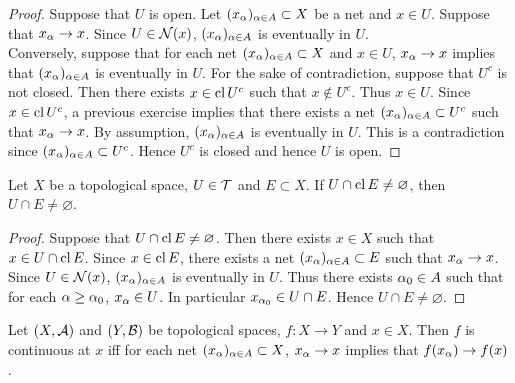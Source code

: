 \documentclass{book}
\begin{document}
	\begin{proof}
		Suppose that $U$ is open. Let $(x_{\alpha})_{\alpha \in A} \subset X$ be a net and $x \in U$. Suppose that $x_{\alpha} \rightarrow x$. Since $U \in \mathcal{N}(x)$, $(x_{\alpha})_{\alpha \in A}$ is eventually in $U$. \\
		Conversely, suppose that for each net $(x_{\alpha})_{\alpha \in A} \subset X$ and $x \in U$, $x_{\alpha} \rightarrow x$ implies that $(x_{\alpha})_{\alpha \in A} $ is eventually in $U$. For the sake of contradiction, suppose that $U^c$ is not closed. Then there exists $x \in \operatorname{cl} U^c$ such that $x \not \in U^c$. Thus $x \in U$. Since $x \in \operatorname{cl} U^c$, a previous exercise implies that there exists a net $(x_{\alpha})_{\alpha \in A} \subset U^c$ such that $x_{\alpha} \rightarrow x$. By assumption, $(x_{\alpha})_{\alpha \in A}$ is eventually in $U$. This is a contradiction since $(x_{\alpha})_{\alpha \in A} \subset U^c$. Hence $U^c$ is closed and hence $U$ is open. 
	\end{proof}

	\begin{ex} 
		Let $X$ be a topological space, $U \in \mathcal{T}$ and $E \subset X$. If $U \cap \operatorname{cl} E \neq \varnothing$, then $U \cap E \neq \varnothing$. 
	\end{ex}

	\begin{proof}
		Suppose that $U \cap \operatorname{cl} E \neq \varnothing$. Then there exists $x \in X$ such that $x \in U \cap \operatorname{cl} E$. Since $x \in \operatorname{cl} E$, there exists a net $(x_{\alpha})_{\alpha \in A} \subset E$ such that $x_{\alpha} \rightarrow x$. Since $U \in \mathcal{N}(x)$, $(x_{\alpha})_{\alpha \in A}$ is eventually in $U$. Thus there exists $\alpha_0 \in A$ such that for each $\alpha \geq \alpha_0$, $x_{\alpha} \in U$. In particular $x_{\alpha_0} \in U \cap E$. Hence $U \cap E \neq \varnothing$. 
	\end{proof}
	
	\begin{ex} 
	Let $(X,\mathcal{A})$ and $(Y,\mathcal{B})$ be topological spaces, $f:X \rightarrow Y$ and $x \in X$. Then $f$ is continuous at $x$ iff for each net $(x_{\alpha})_{\alpha \in A} \subset X$, $x_{\alpha} \rightarrow x$ implies that $f(x_{\alpha}) \rightarrow f(x)$. 
	\end{ex}
	
\end{document}
